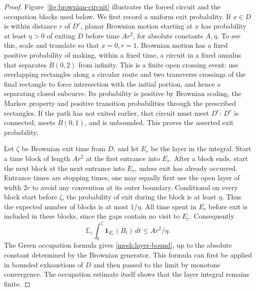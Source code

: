 \documentclass[11pt]{article}
\theoremstyle{definition}
\theoremstyle{remark}
\numberwithin{equation}{section}
\begin{document}
\begin{proof}
Figure~\ref{fig:brownian-circuit} illustrates the forced circuit and
the occupation blocks used below. We first record a uniform exit probability.  If $x\in D$ is within
distance $r$ of $D^c$, planar Brownian motion starting at $x$ has
probability at least $\eta>0$ of exiting $D$ before time $Ar^2$, for
absolute constants $A,\eta$.  To see this, scale and translate so that
$x=0,r=1$.  Brownian motion has a fixed positive probability of making,
within a fixed time, a circuit in a fixed annulus that separates
$\overline B(0,2)$ from infinity.  This is a finite open crossing event:
use overlapping rectangles along a circular route and two transverse
crossings of the final rectangle to force intersection with the
initial portion, and hence a separating closed subcurve.  Its
probability is positive by Brownian scaling, the Markov property and
positive transition probabilities through the prescribed rectangles.
If the path has not exited earlier, that circuit must meet $D^c$:
$D^c$ is connected, meets $\overline B(0,1)$, and is unbounded.  This
proves the asserted exit probability.

Let $\zeta$ be Brownian exit time from $D$, and let $E_r$ be the layer
in the integral.  Start a time block of length $Ar^2$ at the first
entrance into $E_r$.  After a block ends, start the next block at the
next entrance into $E_r$, unless exit has already occurred.  Entrance
times are stopping times; one may equally first use the open layer of
width $2r$ to avoid any convention at its outer boundary.  Conditional
on every block start before $\zeta$, the probability of exit during
the block is at least $\eta$.  Thus the expected number of blocks is
at most $1/\eta$.  All time spent in $E_r$ before exit is included in
these blocks, since the gaps contain no visit to $E_r$.  Consequently
\[
 \mathbb E_z\int_0^\zeta\mathbf1_{E_r}(B_t)\,dt
 \le Ar^2/\eta.
\]
The Green occupation formula gives \eqref{mesh:layer-bound}, up to the
absolute constant determined by the Brownian generator.  This formula
can first be applied in bounded exhaustions of $D$ and then passed to
the limit by monotone convergence.  The occupation estimate itself
shows that the layer integral remains finite.
\end{proof}
\end{document}
